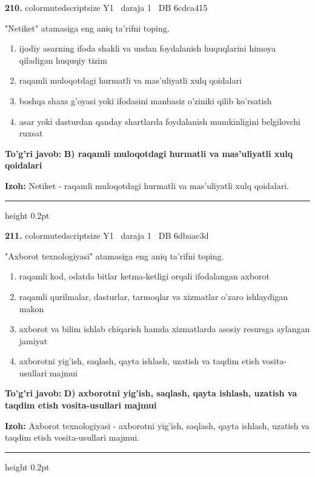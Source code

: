 \documentclass[10pt,a4paper,oneside]{article}
\begin{document}
\noindent\textbf{\color{ink}210.}  {color{muted}scriptsize Y1 \textbullet\ daraja 1 \textbullet\ DB 6cdca415}
\par
"Netiket" atamasiga eng aniq ta'rifni toping.
\begin{enumerate}[label=\Alph*),leftmargin=9mm]
\item ijodiy asarning ifoda shakli va undan foydalanish huquqlarini himoya qiladigan huquqiy tizim
\item raqamli muloqotdagi hurmatli va mas'uliyatli xulq qoidalari
\item boshqa shaxs g'oyasi yoki ifodasini manbasiz o'ziniki qilib ko'rsatish
\item asar yoki dasturdan qanday shartlarda foydalanish mumkinligini belgilovchi ruxsat
\end{enumerate}
\begin{tcolorbox}[enhanced,breakable,colback=teal!4,colframe=teal!50!black,boxrule=0.5pt,arc=1.1mm,left=3mm,right=3mm,top=1.7mm,bottom=1.7mm,before skip=2mm,after skip=2mm]
\textbf{\color{teal}To'g'ri javob:} \textbf{B) raqamli muloqotdagi hurmatli va mas'uliyatli xulq qoidalari}
\par\smallskip
\textbf{Izoh:} Netiket - raqamli muloqotdagi hurmatli va mas'uliyatli xulq qoidalari.
\end{tcolorbox}
\vspace{2mm}\hrule height 0.2pt \vspace{3mm}

\noindent\textbf{\color{ink}211.}  {color{muted}scriptsize Y1 \textbullet\ daraja 1 \textbullet\ DB 6dbaac3d}
\par
"Axborot texnologiyasi" atamasiga eng aniq ta'rifni toping.
\begin{enumerate}[label=\Alph*),leftmargin=9mm]
\item raqamli kod, odatda bitlar ketma-ketligi orqali ifodalangan axborot
\item raqamli qurilmalar, dasturlar, tarmoqlar va xizmatlar o'zaro ishlaydigan makon
\item axborot va bilim ishlab chiqarish hamda xizmatlarda asosiy resursga aylangan jamiyat
\item axborotni yig'ish, saqlash, qayta ishlash, uzatish va taqdim etish vosita-usullari majmui
\end{enumerate}
\begin{tcolorbox}[enhanced,breakable,colback=teal!4,colframe=teal!50!black,boxrule=0.5pt,arc=1.1mm,left=3mm,right=3mm,top=1.7mm,bottom=1.7mm,before skip=2mm,after skip=2mm]
\textbf{\color{teal}To'g'ri javob:} \textbf{D) axborotni yig'ish, saqlash, qayta ishlash, uzatish va taqdim etish vosita-usullari majmui}
\par\smallskip
\textbf{Izoh:} Axborot texnologiyasi - axborotni yig'ish, saqlash, qayta ishlash, uzatish va taqdim etish vosita-usullari majmui.
\end{tcolorbox}
\vspace{2mm}\hrule height 0.2pt \vspace{3mm}
\end{document}
